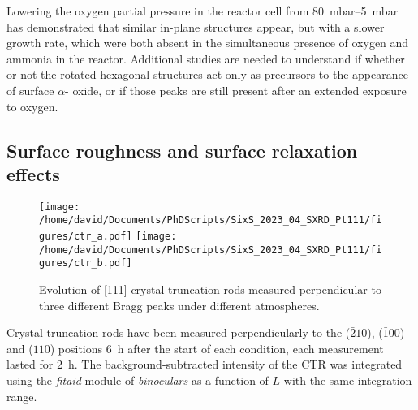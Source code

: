 Lowering the oxygen partial pressure in the reactor cell from \qtyrange{80}{5}{\milli\bar} has demonstrated that similar in-plane structures appear, but with a slower growth rate, which were both absent in the simultaneous presence of oxygen and ammonia in the reactor.
Additional studies are needed to understand if whether or not the rotated hexagonal structures act only as precursors to the appearance of surface $\alpha$- oxide, or if those peaks are still present after an extended exposure to oxygen.



\subsection{Surface roughness and surface relaxation effects}

\begin{figure}[!htb]
    \centering
    \texttt{[image: /home/david/Documents/PhDScripts/SixS\_2023\_04\_SXRD\_Pt111/figures/ctr\_a.pdf]}
    \texttt{[image: /home/david/Documents/PhDScripts/SixS\_2023\_04\_SXRD\_Pt111/figures/ctr\_b.pdf]}
    \caption{
        Evolution of [111] crystal truncation rods measured perpendicular to three different Bragg peaks under different atmospheres.
    }
    \label{fig:CTRPt111}
\end{figure}

Crystal truncation rods have been measured perpendicularly to the ($\bar{2}10$), ($\bar{1}00$) and ($\bar{1}\bar{1}0$) positions \qty{6}{\hour} after the start of each condition, each measurement lasted for \qty{2}{\hour}.
The background-subtracted intensity of the CTR was integrated using the \textit{fitaid} module of \textit{binoculars} as a function of $L$ with the same integration range.

